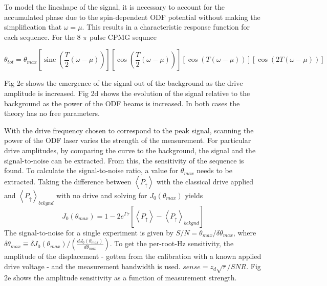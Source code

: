 \documentclass[aps,prl,twocolumn,groupedaddress]{revtex4-1}
\DeclareMathOperator{\sinc}{sinc}
\begin{document}
To model the lineshape of the signal, it is necessary to account for the accumulated phase due to the spin-dependent ODF potential without making the simplification that $ \omega = \mu $. This results in a characteristic response function for each sequence. For the 8 $\pi$ pulse CPMG sequnce

\begin{widetext}
\begin{equation}
\theta_{tot} = \theta_{max} \left[ \sinc \left( \frac{T}{2} \left( \omega-\mu \right) \right) \right] 
\left[ \cos \left( \frac{T}{2} \left( \omega - \mu \right) \right) \right] \left[ \cos(T(\omega - \mu)) \right] \left[ \cos(2T(\omega - \mu)) \right] 
\end{equation}
\end{widetext}
Fig 2c shows the emergence of the signal out of the background as the drive amplitude is increased. Fig 2d shows the evolution of the signal relative to the background as the power of the ODF beams is increased. In both cases the theory has no free parameters.

With the drive frequency chosen to correspond to the peak signal, scanning the power of the ODF laser varies the strength of the measurement. For particular drive amplitudes, by comparing the curve to the background, the signal and the signal-to-noise can be extracted. From this, the sensitivity of the sequence is found. To calculate the signal-to-noise ratio, a value for $\theta_{max}$ needs to be extracted. Taking the difference between $\left< P_{\uparrow} \right>$ with the classical drive applied and $\left< P_{\uparrow} \right>_{bckgnd}$ with no drive and solving for $J_0(\theta_{max})$ yields
\[J_0(\theta_{max}) = 1 - 2e^{\Gamma \tau} \left[ \left< P_{\uparrow} \right> - \left< P_{\uparrow} \right>_{bckgnd} \right] \]
The signal-to-noise for a single experiment is given by $S/N =\theta_{max}/\delta \theta_{max}$, where $\delta \theta_{max} \equiv \delta J_0(\theta_{max})/ \left( \frac{dJ_0(\theta_{max})}{d\theta_{max}} \right)$. To get the per-root-Hz sensitivity, the amplitude of the displacement - gotten from the calibration with a known applied drive voltage - and the measurement bandwidth is used. $sense = z_d\sqrt{\tau}/SNR$. Fig 2e shows the amplitude sensitivity as a function of measurement strength.
\end{document}
